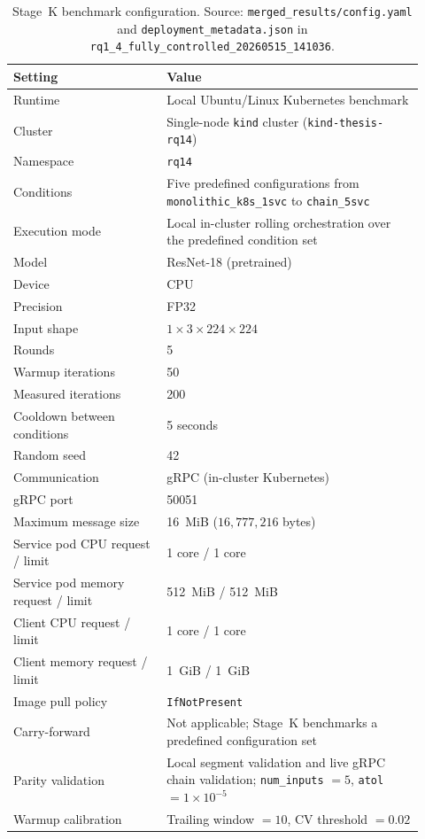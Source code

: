 \begin{table}[ht]
\centering
\caption[Stage~K benchmark configuration]{Stage~K benchmark configuration. Source: \texttt{merged\_results/config.yaml} and \texttt{deployment\_metadata.json} in \texttt{rq1\_4\_fully\_controlled\_20260515\_141036}.}
\label{tab:rq14_config}
\begin{tabular}{p{0.34\linewidth}p{0.58\linewidth}}
\toprule
\textbf{Setting} & \textbf{Value} \\
\midrule
Runtime & Local Ubuntu/Linux Kubernetes benchmark \\
Cluster & Single-node \texttt{kind} cluster (\texttt{kind-thesis-rq14}) \\
Namespace & \texttt{rq14} \\
Conditions & Five predefined configurations from \texttt{monolithic\_k8s\_1svc} to \texttt{chain\_5svc} \\
Execution mode & Local in-cluster rolling orchestration over the predefined condition set \\
Model & ResNet-18 (pretrained) \\
Device & CPU \\
Precision & FP32 \\
Input shape & $1 \times 3 \times 224 \times 224$ \\
Rounds & 5 \\
Warmup iterations & 50 \\
Measured iterations & 200 \\
Cooldown between conditions & 5 seconds \\
Random seed & 42 \\
Communication & gRPC (in-cluster Kubernetes) \\
gRPC port & 50051 \\
Maximum message size & 16~MiB ($16{,}777{,}216$ bytes) \\
Service pod CPU request / limit & 1 core / 1 core \\
Service pod memory request / limit & 512~MiB / 512~MiB \\
Client CPU request / limit & 1 core / 1 core \\
Client memory request / limit & 1~GiB / 1~GiB \\
Image pull policy & \texttt{IfNotPresent} \\
Carry-forward & Not applicable; Stage~K benchmarks a predefined configuration set \\
Parity validation & Local segment validation and live gRPC chain validation; \texttt{num\_inputs} $= 5$, \texttt{atol} $= 1 \times 10^{-5}$ \\
Warmup calibration & Trailing window $= 10$, CV threshold $= 0.02$ \\
\bottomrule
\end{tabular}
\end{table}

